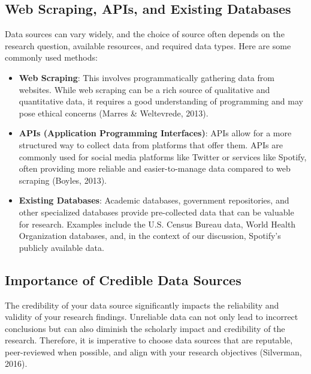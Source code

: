 \documentclass[
  b5paper]{book}
\begin{document}
\hypertarget{web-scraping-apis-and-existing-databases}{%
\subsection*{Web Scraping, APIs, and Existing Databases}\label{web-scraping-apis-and-existing-databases}}

Data sources can vary widely, and the choice of source often depends on the research question, available resources, and required data types. Here are some commonly used methods:

\begin{itemize}
\item
  \textbf{Web Scraping}: This involves programmatically gathering data from websites. While web scraping can be a rich source of qualitative and quantitative data, it requires a good understanding of programming and may pose ethical concerns (Marres \& Weltevrede, 2013).
\item
  \textbf{APIs (Application Programming Interfaces)}: APIs allow for a more structured way to collect data from platforms that offer them. APIs are commonly used for social media platforms like Twitter or services like Spotify, often providing more reliable and easier-to-manage data compared to web scraping (Boyles, 2013).
\item
  \textbf{Existing Databases}: Academic databases, government repositories, and other specialized databases provide pre-collected data that can be valuable for research. Examples include the U.S. Census Bureau data, World Health Organization databases, and, in the context of our discussion, Spotify's publicly available data.
\end{itemize}

\hypertarget{importance-of-credible-data-sources}{%
\subsection*{Importance of Credible Data Sources}\label{importance-of-credible-data-sources}}

The credibility of your data source significantly impacts the reliability and validity of your research findings. Unreliable data can not only lead to incorrect conclusions but can also diminish the scholarly impact and credibility of the research. Therefore, it is imperative to choose data sources that are reputable, peer-reviewed when possible, and align with your research objectives (Silverman, 2016).
\end{document}
